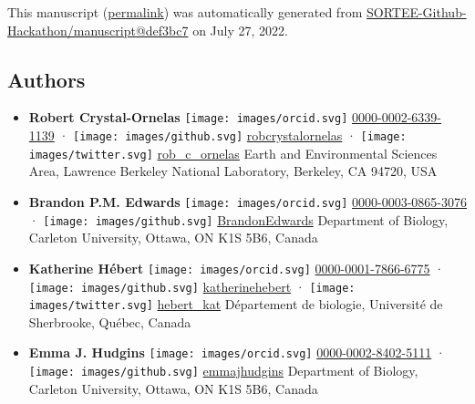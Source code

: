 This manuscript
(\href{https://SORTEE-Github-Hackathon.github.io/manuscript/v/def3bc7be9dc165100774b0e53208fbd9e00a9ba/}{permalink})
was automatically generated
from \href{https://github.com/SORTEE-Github-Hackathon/manuscript/tree/def3bc7be9dc165100774b0e53208fbd9e00a9ba}{SORTEE-Github-Hackathon/manuscript@def3bc7}
on July 27, 2022.

\hypertarget{authors}{%
\subsection{Authors}\label{authors}}

\begin{itemize}
\item
  \textbf{Robert Crystal-Ornelas}
  \texttt{[image: images/orcid.svg]}
  \href{https://orcid.org/0000-0002-6339-1139}{0000-0002-6339-1139}
  · \texttt{[image: images/github.svg]}
  \href{https://github.com/robcrystalornelas}{robcrystalornelas}
  · \texttt{[image: images/twitter.svg]}
  \href{https://twitter.com/rob_c_ornelas}{rob\_c\_ornelas}
  Earth and Environmental Sciences Area, Lawrence Berkeley National Laboratory, Berkeley, CA 94720, USA
\item
  \textbf{Brandon P.M. Edwards}
  \texttt{[image: images/orcid.svg]}
  \href{https://orcid.org/0000-0003-0865-3076}{0000-0003-0865-3076}
  · \texttt{[image: images/github.svg]}
  \href{https://github.com/BrandonEdwards}{BrandonEdwards}
  Department of Biology, Carleton University, Ottawa, ON K1S 5B6, Canada
\item
  \textbf{Katherine Hébert}
  \texttt{[image: images/orcid.svg]}
  \href{https://orcid.org/0000-0001-7866-6775}{0000-0001-7866-6775}
  · \texttt{[image: images/github.svg]}
  \href{https://github.com/katherinehebert}{katherinehebert}
  · \texttt{[image: images/twitter.svg]}
  \href{https://twitter.com/hebert_kat}{hebert\_kat}
  Département de biologie, Université de Sherbrooke, Québec, Canada
\item
  \textbf{Emma J. Hudgins}
  \texttt{[image: images/orcid.svg]}
  \href{https://orcid.org/0000-0002-8402-5111}{0000-0002-8402-5111}
  · \texttt{[image: images/github.svg]}
  \href{https://github.com/emmajhudgins}{emmajhudgins}
  Department of Biology, Carleton University, Ottawa, ON K1S 5B6, Canada

\end{itemize}
